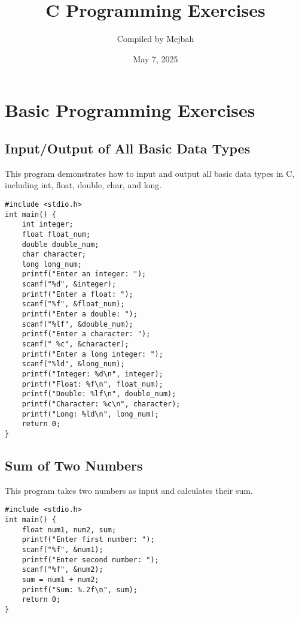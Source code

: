 \documentclass[a4paper,12pt]{article}
\title{C Programming Exercises}
\author{Compiled by Mejbah}
\date{May 7, 2025}
\begin{document}
\maketitle

\tableofcontents


\section{Basic Programming Exercises}

\subsection{Input/Output of All Basic Data Types}
This program demonstrates how to input and output all basic data types in C, including int, float, double, char, and long.

\begin{lstlisting}[caption={Input/Output of All Basic Data Types}]
#include <stdio.h>
int main() {
    int integer;
    float float_num;
    double double_num;
    char character;
    long long_num;
    printf("Enter an integer: ");
    scanf("%d", &integer);
    printf("Enter a float: ");
    scanf("%f", &float_num);
    printf("Enter a double: ");
    scanf("%lf", &double_num);
    printf("Enter a character: ");
    scanf(" %c", &character);
    printf("Enter a long integer: ");
    scanf("%ld", &long_num);
    printf("Integer: %d\n", integer);
    printf("Float: %f\n", float_num);
    printf("Double: %lf\n", double_num);
    printf("Character: %c\n", character);
    printf("Long: %ld\n", long_num);
    return 0;
}
\end{lstlisting}

\newpage

\subsection{Sum of Two Numbers}
This program takes two numbers as input and calculates their sum.

\begin{lstlisting}[caption={Sum of Two Numbers}]
#include <stdio.h>
int main() {
    float num1, num2, sum;
    printf("Enter first number: ");
    scanf("%f", &num1);
    printf("Enter second number: ");
    scanf("%f", &num2);
    sum = num1 + num2;
    printf("Sum: %.2f\n", sum);
    return 0;
}
\end{lstlisting}
\end{document}
